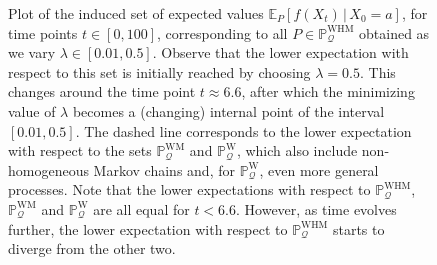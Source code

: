 \documentclass[10pt,a4paper]{paper}
\theoremstyle{definition}
\newcommand{\processes}{\mathbb{P}}
\newcommand{\wprocesses}{\processes^{\mathrm{W}}}
\newcommand{\wmprocesses}{\processes^{\mathrm{WM}}}
\newcommand{\whmprocesses}{\processes^{\mathrm{WHM}}}
\newcommand{\rateset}{\mathcal{Q}}
\begin{document}
\begin{figure}[t]
\caption{Plot of the induced set of expected values $\mathbb{E}_P[f(X_t)\,\vert\,X_0=a]$, for time points $t\in[0,100]$, corresponding to all $P\in\whmprocesses_{\rateset}$ obtained as we vary $\lambda\in[0.01,0.5]$. Observe that the lower expectation with respect to this set is initially reached by choosing $\lambda=0.5$. This changes around the time point $t\approx 6.6$, after which the minimizing value of $\lambda$ becomes a (changing) internal point of the interval $[0.01,0.5]$. The dashed line corresponds to the lower expectation with respect to the sets $\wmprocesses_\rateset$ and $\wprocesses_\rateset$, which also include non-homogeneous Markov chains and, for $\wprocesses_\rateset$, even more general processes. Note that the lower expectations with respect to $\whmprocesses_{\rateset}$, $\wmprocesses_{\rateset}$ and $\wprocesses_{\rateset}$ are all equal for $t<6.6$. However, as time evolves further, the lower expectation with respect to $\whmprocesses_{\rateset}$ starts to diverge from the other two.}
\label{fig:homogeneousCounterExample}
\end{figure}
\end{document}
